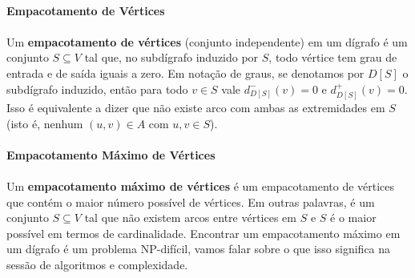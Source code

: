 \documentclass[12pt,a4paper]{article}
\begin{document}
\paragraph{Empacotamento de Vértices}
\paragraph{}Um \textbf{empacotamento de vértices} (conjunto independente) em um dígrafo é um conjunto \(S\subseteq V\) tal que, no subdígrafo induzido por \(S\), todo vértice tem grau de entrada e de saída iguais a zero. Em notação de graus, se denotamos por \(D[S]\) o subdígrafo induzido, então para todo \(v\in S\) vale \(d^-_{D[S]}(v)=0\) e \(d^+_{D[S]}(v)=0\). Isso é equivalente a dizer que não existe arco com ambas as extremidades em \(S\) (isto é, nenhum \((u,v)\in A\) com \(u,v\in S\)).

\paragraph{Empacotamento Máximo de Vértices}
\paragraph{}
Um \textbf{empacotamento máximo de vértices} é um empacotamento de vértices que contém o maior número possível de vértices. Em outras palavras, é um conjunto \(S\subseteq V\) tal que não existem arcos entre vértices em \(S\) e \(S\) é o maior possível em termos de cardinalidade. Encontrar um empacotamento máximo em um dígrafo é um problema NP-difícil, vamos falar sobre o que isso significa na sessão de algoritmos e complexidade.

\begin{center}
\label{fig:empacotamento-max}
\end{center}
\end{document}

